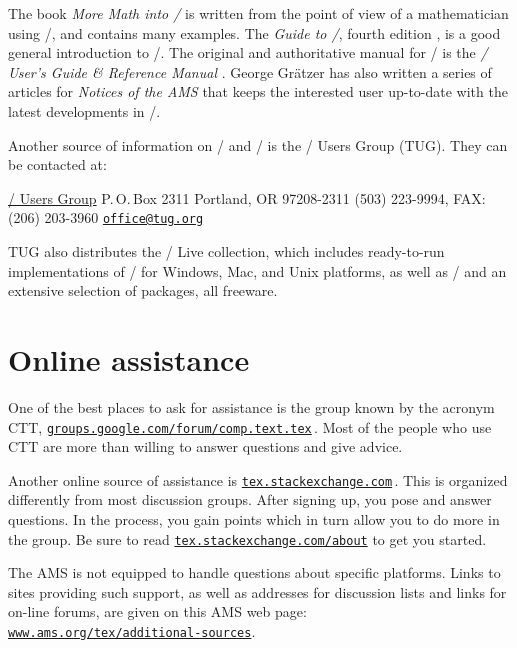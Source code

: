 The book \textit{More Math into \latex/} \cite{Gr} is written from the point
of view of a mathematician using \amslatex/, and contains many examples.
The \textit{Guide to \latex/}, fourth edition \cite{KD}, is a good
general introduction to \latex/.  The original and authoritative manual
 for \latex/ is the \textit{\latex/ User's Guide \& Reference Manual}
\cite{La}.  George Gr\"atzer has also written a series of articles for
\emph{Notices of the AMS} \cite{Gr1,Gr2,Gr3,Gr4,Gr5,Gr6,Gr7} that keeps
the interested user up-to-date with the latest developments in \latex/.

Another source of information on \tex/ and \latex/ is the \tex/ Users
Group (TUG)\@.  They can be contacted at:

\beginexample{\rm}
  \href{http://tug.org}{\tex/ Users Group}
  P.\,O.\,Box 2311
  Portland, OR 97208-2311
  (503) 223-9994, FAX: (206) 203-3960
  \href{mailto:office@tug.org}{\texttt{office@tug.org}}
\endexample

\noindent
TUG also distributes the \tex/ Live collection, which includes ready-to-run
implementations of \tex/ for Windows, Mac, and Unix platforms, as well as \latex/
and an extensive selection of packages, all freeware.

\section{Online assistance}

One of the best places to ask for assistance is the group known by the
acronym CTT,
\href{https://groups.google.com/forum/#!forum/comp.text.tex}{\texttt{groups.google.com/forum/comp.text.tex}}\,.
Most of the people who use CTT are more than willing to answer questions and give advice.

Another online source of assistance is
\href{http://tex.stackexchange.com}{\texttt{tex.stackexchange.com}}\,.
This is organized differently from most discussion groups. After signing
up, you pose and answer questions. In the process, you gain points
which in turn allow you to do more in the group. Be sure to read
\href{http://tex.stackexchange.com/about}{\texttt{tex.stackexchange.com/about}}
to get you started.

The AMS is not equipped to handle questions about specific platforms.
Links to sites providing such support, as well as addresses for discussion
lists and links for on-line forums, are given on this AMS web page:\\
\href{http://www.ams.org/tex/additional-sources}{\texttt{www.ams.org/tex/additional-sources}}.

\endinput
